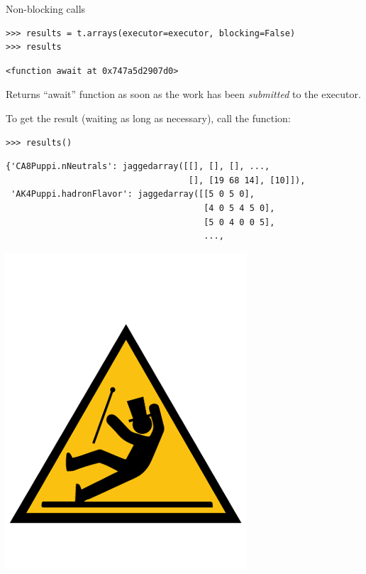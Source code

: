 \documentclass[aspectratio=169]{beamer}
\begin{document}
\begin{frame}[fragile]{Non-blocking calls}
\vspace{0.5 cm}
\small
\begin{verbatim}
>>> results = t.arrays(executor=executor, blocking=False)
>>> results
\end{verbatim}
\begin{verbatim}
<function await at 0x747a5d2907d0>
\end{verbatim}

\vspace{0.25 cm}
{\normalsize Returns ``await'' function as soon as the work has been {\it submitted} to the executor.}

\vspace{0.25 cm}
{\normalsize To get the result (waiting as long as necessary), call the function:}
\begin{verbatim}
>>> results()
\end{verbatim}
\begin{verbatim}
{'CA8Puppi.nNeutrals': jaggedarray([[], [], [], ...,
                                    [], [19 68 14], [10]]),
 'AK4Puppi.hadronFlavor': jaggedarray([[5 0 5 0],
                                       [4 0 5 4 5 0],
                                       [5 0 4 0 0 5],
                                       ...,
\end{verbatim}

\vspace{-2 cm}
\hfill \includegraphics[width=1.5 cm]{caution.png}\hspace{-0.9 cm}
\vspace{2 cm}
\end{frame}
\end{document}
